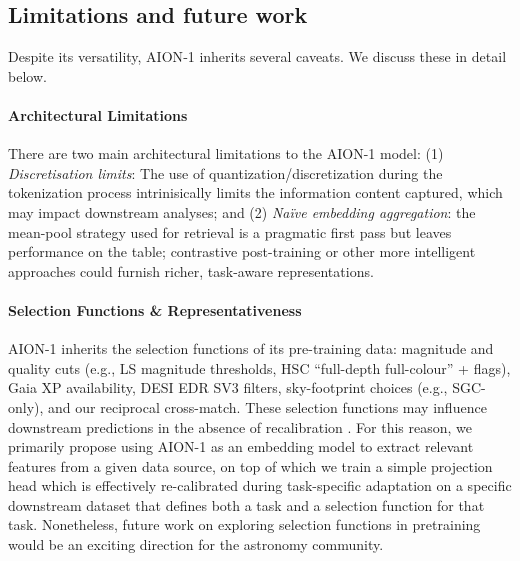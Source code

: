 \documentclass[]{polymathic}
\begin{document}
\subsection{Limitations and future work}
\label{subsec:limitations}
Despite its versatility, AION‑1 inherits several caveats. We discuss these in detail below.

\paragraph{Architectural Limitations} There are two main architectural limitations to the AION-1 model: (1) \emph{Discretisation limits}: The use of quantization/discretization during the tokenization process intrinisically limits the information content captured, which may impact downstream analyses; and (2) \emph{Naïve embedding aggregation}: the mean-pool strategy used for retrieval is a pragmatic first pass but leaves performance on the table; contrastive post-training or other more intelligent approaches could furnish richer, task-aware representations.

\paragraph{Selection Functions \& Representativeness} AION-1 inherits the selection functions of its pre-training data: magnitude and quality cuts (e.g., LS magnitude thresholds, HSC ``full-depth full-colour'' + flags), Gaia XP availability, DESI EDR SV3 filters, sky-footprint choices (e.g., SGC-only), and our reciprocal cross-match. These selection functions may influence downstream predictions in the absence of recalibration  \citep{kumar2022finetuningdistortpretrainedfeatures, gallegos2024biasfairnesslargelanguage, thaler2024farbiasgo}. For this reason, we primarily propose using AION-1 as an embedding model to extract relevant features from a given data source, on top of which we train a simple projection head which is effectively re-calibrated during task-specific adaptation on a specific downstream dataset that defines both a task and a selection function for that task. Nonetheless, future work on exploring selection functions in pretraining would be an exciting direction for the astronomy community. 
\end{document}
